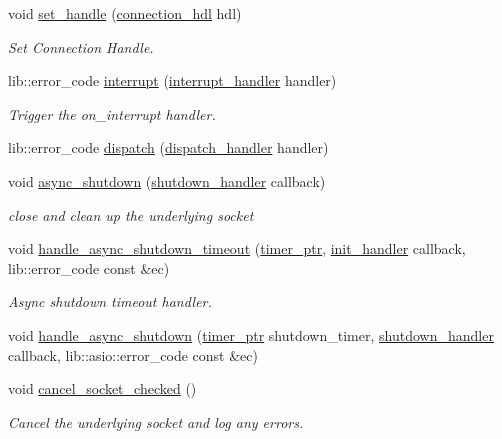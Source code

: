 \begin{DoxyCompactItemize}
void \hyperlink{classwebsocketpp_1_1transport_1_1asio_1_1connection_ac6dae6a18678187b7da35f5b064c9ddd}{set\+\_\+handle} (\hyperlink{namespacewebsocketpp_a6b3d26a10ee7229b84b776786332631d}{connection\+\_\+hdl} hdl)
\begin{DoxyCompactList}\small\item\em Set Connection Handle. \end{DoxyCompactList}\item 
lib\+::error\+\_\+code \hyperlink{classwebsocketpp_1_1transport_1_1asio_1_1connection_a2fc9b41450047e40a3b5476c0e3bf853}{interrupt} (\hyperlink{namespacewebsocketpp_1_1transport_a8090563b066d7e8e31f7165be18dee51}{interrupt\+\_\+handler} handler)
\begin{DoxyCompactList}\small\item\em Trigger the on\+\_\+interrupt handler. \end{DoxyCompactList}\item 
lib\+::error\+\_\+code \hyperlink{classwebsocketpp_1_1transport_1_1asio_1_1connection_a660c671234223eb60517d26bbbc0268a}{dispatch} (\hyperlink{namespacewebsocketpp_1_1transport_a6658447b2e10f4c712dd792aad0e0c78}{dispatch\+\_\+handler} handler)
\item 
void \hyperlink{classwebsocketpp_1_1transport_1_1asio_1_1connection_a7a3767d922bb2cc97f71dd2fb2f0e903}{async\+\_\+shutdown} (\hyperlink{namespacewebsocketpp_1_1transport_af39aff6fc4cb76f7df0d5322b734d156}{shutdown\+\_\+handler} callback)
\begin{DoxyCompactList}\small\item\em close and clean up the underlying socket \end{DoxyCompactList}\item 
void \hyperlink{classwebsocketpp_1_1transport_1_1asio_1_1connection_a9386ad48e8b2137987205bc4e831edfb}{handle\+\_\+async\+\_\+shutdown\+\_\+timeout} (\hyperlink{classwebsocketpp_1_1transport_1_1asio_1_1connection_a96d8a6cd5cf1120208b206da109a194e}{timer\+\_\+ptr}, \hyperlink{namespacewebsocketpp_1_1transport_aeae75e675c1a334b3b33ab7120b480a5}{init\+\_\+handler} callback, lib\+::error\+\_\+code const \&ec)
\begin{DoxyCompactList}\small\item\em Async shutdown timeout handler. \end{DoxyCompactList}\item 
void \hyperlink{classwebsocketpp_1_1transport_1_1asio_1_1connection_ad7a28616792a3bae4dfc215ebfc640c6}{handle\+\_\+async\+\_\+shutdown} (\hyperlink{classwebsocketpp_1_1transport_1_1asio_1_1connection_a96d8a6cd5cf1120208b206da109a194e}{timer\+\_\+ptr} shutdown\+\_\+timer, \hyperlink{namespacewebsocketpp_1_1transport_af39aff6fc4cb76f7df0d5322b734d156}{shutdown\+\_\+handler} callback, lib\+::asio\+::error\+\_\+code const \&ec)
\item 
void \hyperlink{classwebsocketpp_1_1transport_1_1asio_1_1connection_ac4b63fadf2083ab4656ab7f1a47d3b5d}{cancel\+\_\+socket\+\_\+checked} ()
\begin{DoxyCompactList}\small\item\em Cancel the underlying socket and log any errors. \end{DoxyCompactList}\end{DoxyCompactItemize}
